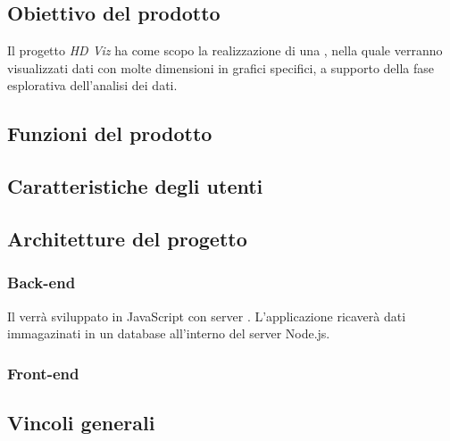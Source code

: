 \documentclass[../analisi-dei-requisiti.tex]{subfiles}
\begin{document}
\subsection{Obiettivo del prodotto}
\label{subs:obiettivo_del_prodotto}
Il progetto \emph{HD Viz} ha come scopo la realizzazione di una , nella quale verranno visualizzati dati con molte dimensioni in grafici specifici, a supporto della fase esplorativa dell'analisi dei dati.


\subsection{Funzioni del prodotto}
\label{subs:funzioni_del_prodotto}


\subsection{Caratteristiche degli utenti}
\label{subs:caratteristiche_degli_utenti}


\subsection{Architetture del progetto}
\label{subs:architetture_e_tecnologie_del_progetto}
\subsubsection{Back-end}
Il  verrà sviluppato in JavaScript con server . L'applicazione ricaverà dati immagazinati in un database  all'interno del server Node.js.


\subsubsection{Front-end}


\subsection{Vincoli generali}
\label{subs:vincoli_generali}
\end{document}

